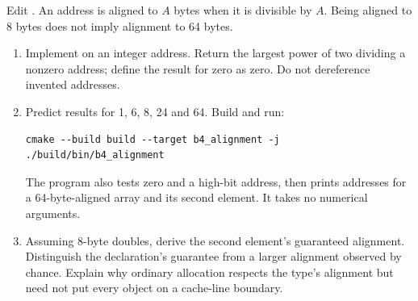 Edit . An address is aligned to $A$ bytes when it is
divisible by $A$. Being aligned to 8 bytes does not imply alignment to 64 bytes.
\begin{enumerate}
\item Implement  on an integer address. Return the
largest power of two dividing a nonzero address; define the result for zero as
zero. Do not dereference invented addresses.
\item Predict results for 1, 6, 8, 24 and 64. Build and run:
\begin{lstlisting}[style=shell]
cmake --build build --target b4_alignment -j
./build/bin/b4_alignment
\end{lstlisting}
The program also tests zero and a high-bit address, then prints addresses for a
64-byte-aligned array and its second element. It takes no numerical arguments.
\item Assuming 8-byte doubles, derive the second element's guaranteed alignment.
Distinguish the declaration's guarantee from a larger alignment observed by chance.
Explain why ordinary allocation respects the type's alignment but need not put
every object on a cache-line boundary.
\end{enumerate}
